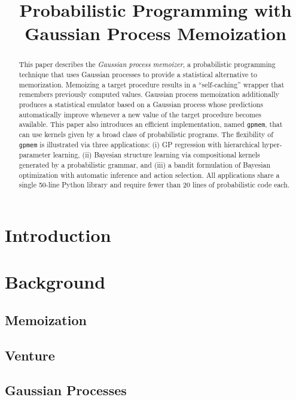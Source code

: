 \documentclass[twoside,11pt]{article}
\begin{document}
\title{Probabilistic Programming with Gaussian Process Memoization}


\author{}

\editor{}

\maketitle
\begin{abstract}
This paper describes the {\em Gaussian process memoizer}, a probabilistic programming technique that uses Gaussian processes to provide a statistical alternative to memorization. Memoizing a target procedure results in a “self-caching” wrapper that remembers previously computed values. Gaussian process memoization additionally produces a statistical emulator based on a Gaussian process whose predictions automatically improve whenever a new value of the target procedure becomes available. This paper also introduces  an efficient implementation, named {\tt gpmem}, that can use kernels given by a broad class of probabilistic programs. The flexibility of {\tt gpmem} is illustrated via three applications: (i) GP regression with hierarchical hyper-parameter learning, (ii) Bayesian structure learning via compositional kernels generated by a probabilistic grammar, and (iii) a bandit formulation of Bayesian optimization with automatic inference and action selection. All applications share a single 50-line Python library and require fewer than 20 lines of probabilistic code each.
\end{abstract}

\section{Introduction}


\section{Background}
\subsection{Memoization}

\subsection{Venture}

\subsection{Gaussian Processes}

\end{document}
